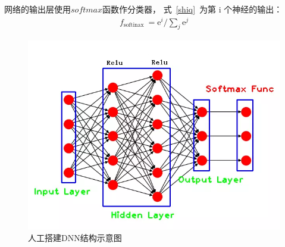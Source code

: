 \documentclass{whutmod}
\begin{document}
	网络的输出层使用$ softmax $函数作分类器， 式~\ref{shiq}~为第 i 个神经的输出：
	\begin{gather}\label{shiq}
		f_{\text {softinax }}=\mathrm{e}^{i} / \sum_{j} \mathrm{e}^{j}
	\end{gather}
	
		\begin{figure}[H]
		\centering
		\includegraphics[width=\textwidth]{figures/sss.png}
		\caption{人工搭建DNN结构示意图}\label{dnn}
	\end{figure}
	
	
\end{document}
